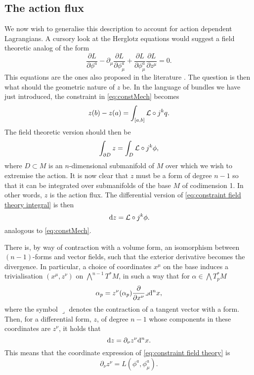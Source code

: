 \documentclass[../main.tex]{subfiles}
\begin{document}
\subsection{The action flux}
We now wish to generalise this description to account for action dependent Lagrangians. A cursory look at the Herglotz equations would suggest a field theoretic analog of the form 
\begin{equation}
	\frac{\partial L}{\partial \phi^a} - \partial_\mu \frac{\partial L}{\partial
\phi ^a_\mu} + \frac{\partial L}{\partial \phi^a_\mu}\frac{\partial
L}{\partial z^\mu} = 0. 
\end{equation}
This equations are the ones also proposed in the literature \cite{Gaset2020a,Lazo2018,de_leon_multicontact_2022}. The question is then what should the geometric nature of \(z\) be. In the language of bundles we have just introduced, the constraint in \cref{eq:constMech} becomes
\begin{equation}\label{eq:constraint field theory integral}
    z(b) - z(a) = \int_{[a,b]}  \mathcal{L} \circ j^kq.
\end{equation}
The field theoretic version should then be 
\begin{equation}
    \int_{\partial D}z = \int_D  \mathcal{L} \circ j^k\phi,
\end{equation}
where $D\subset M$ is an $n$-dimensional submanifold of \(M\) over which we wish to extremise the action. It is now clear that \(z\) must be a form of degree \(n-1\) so that it can be integrated over submanifolds of the base \(M\) of codimension 1. In other words, \(z\) is the action flux. The differential version of \cref{eq:constraint field theory integral} is then
\begin{equation} \label{eq:constraint field theory}
\,\mathrm{d} z =  \mathcal{L} \circ j^k\phi.
\end{equation}
analogous to \cref{eq:constMech}. 

There is, by way of contraction with a volume form, an isomorphism between \((n-1)\)-forms and vector fields, such that the exterior derivative becomes the divergence. In particular, a choice of coordinates \(x^\mu\) on the base induces a trivialisation \((x^\mu,z^\nu)\) on \(\bigwedge^{n-1} T^\ast M\), in such a way that for \(\alpha \in \bigwedge T^\ast _p M\)
\begin{equation}\label{eq:coordinates flux}
\alpha_p = z^\nu(\alpha_p) \frac{\partial}{\partial x^\nu} \lrcorner \mathrm{d}^n x,
\end{equation}
where the symbol \(\lrcorner \) denotes the contraction of a tangent vector with a form. Then, for a differential form, \(z\), of degree \(n-1\) whose components in these coordinates are \(z^\nu\), it holds that
\begin{equation}
    \mathrm{d} z = \partial_\nu z^\nu \mathrm{d}^nx.
\end{equation}
This means that the coordinate expression of \cref{eq:constraint field theory} is 
\begin{equation} \label{eq:constraint field theory coordinates}
	\partial_\nu z^\nu = L(\phi^a, \phi^a_\mu).
\end{equation}
\end{document}
